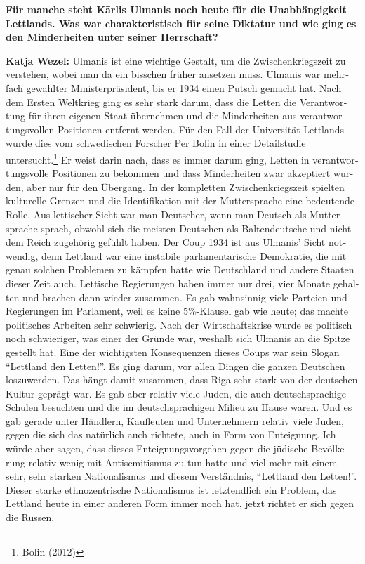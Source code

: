 \begin{otherlanguage}{ngerman}
\textbf{Für manche steht Kārlis Ulmanis noch heute für die Unabhängigkeit Lettlands. Was war charakteristisch für seine Diktatur und wie ging es den Minderheiten unter seiner Herrschaft?} 

\textbf{Katja Wezel:} Ulmanis ist eine wichtige Gestalt, um die Zwischenkriegszeit zu verstehen, wobei man da ein bisschen früher ansetzen muss. Ulmanis war mehrfach gewählter Ministerpräsident, bis er 1934 einen Putsch gemacht hat. Nach dem Ersten Weltkrieg ging es sehr stark darum, dass die Letten die Verantwortung für ihren eigenen Staat übernehmen und die Minderheiten aus verantwortungsvollen Positionen entfernt werden. Für den Fall der Universität Lettlands wurde dies vom schwedischen Forscher Per Bolin in einer Detailstudie untersucht.\footnote{Bolin (2012)} Er weist darin nach, dass es immer darum ging, Letten in verantwortungsvolle Positionen zu bekommen und dass Minderheiten zwar akzeptiert wurden, aber nur für den Übergang. 
In der kompletten Zwischenkriegszeit spielten kulturelle Grenzen und die Identifikation mit der Muttersprache eine bedeutende Rolle. Aus lettischer Sicht war man Deutscher, wenn man Deutsch als Muttersprache sprach, obwohl sich die meisten Deutschen als Baltendeutsche und nicht dem Reich zugehörig gefühlt haben. 
Der Coup 1934 ist aus Ulmanis' Sicht notwendig, denn Lettland war eine instabile parlamentarische Demokratie, die mit genau solchen Problemen zu kämpfen hatte wie Deutschland und andere Staaten dieser Zeit auch. Lettische Regierungen haben immer nur drei, vier Monate gehalten und brachen dann wieder zusammen. Es gab wahnsinnig viele Parteien und Regierungen im Parlament, weil es keine 5\%-Klausel gab wie heute; das machte politisches Arbeiten sehr schwierig. Nach der Wirtschaftskrise wurde es politisch noch schwieriger, was einer der Gründe war, weshalb sich Ulmanis an die Spitze gestellt hat. Eine der wichtigsten Konsequenzen dieses Coups war sein Slogan ``Lettland den Letten!''. Es ging darum, vor allen Dingen die ganzen Deutschen loszuwerden. Das hängt damit zusammen, dass Riga sehr stark von der deutschen Kultur geprägt war. Es gab aber relativ viele Juden, die auch deutschsprachige Schulen besuchten und die im deutschsprachigen Milieu zu Hause waren. Und es gab gerade unter Händlern, Kaufleuten und Unternehmern relativ viele Juden, gegen die sich das natürlich auch richtete, auch in Form von Enteignung. Ich würde aber sagen, dass dieses Enteignungsvorgehen gegen die jüdische Bevölkerung relativ wenig mit Antisemitismus zu tun hatte und viel mehr mit einem sehr, sehr starken Nationalismus und diesem Verständnis, ``Lettland den Letten!''. Dieser starke ethnozentrische Nationalismus ist letztendlich ein Problem, das Lettland heute in einer anderen Form immer noch hat, jetzt richtet er sich gegen die Russen. 


\end{otherlanguage}
